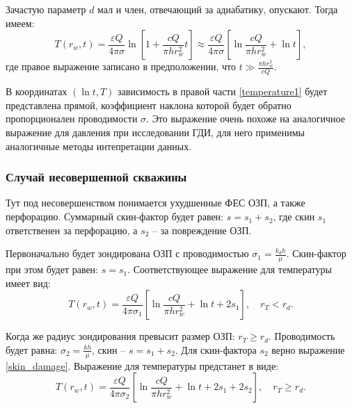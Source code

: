 	Зачастую параметр $d$ мал и член, отвечающий за адиабатику, опускают. Тогда имеем:
\begin{equation}
	\label{temperature1}
	T(r_w, t) = \frac{\varepsilon Q}{4 \pi \sigma}\ln\left[1+\frac{cQ}{\pi h r_w^2}t\right]	\approx
	\frac{\varepsilon Q}{4 \pi \sigma}\left[\ln\frac{cQ}{\pi h r_w^2}+\ln t\right],
\end{equation}
	где правое выражение записано в предположении, что $t \gg \displaystyle\frac{\pi h r_w^2}{cQ}$.
	
	В координатах $(\ln{t}, T)$ зависимость в правой части \eqref{temperature1} будет представлена прямой, коэффициент наклона которой будет обратно пропорционален проводимости $\sigma$.
	Это выражение очень похоже на аналогичное выражение для давления при исследовании ГДИ, для него применимы аналогичные методы интепретации данных.

\subsubsection{Случай несовершенной скважины}
	Тут под несовершенством понимается ухудшенные ФЕС ОЗП, а также перфорацию.
	Суммарный скин-фактор будет равен: $s = s_1 + s_2$, где скин $s_1$ ответственен за перфорацию, а $s_2$ -- за повреждение ОЗП.
	
	Первоначально будет зондирована ОЗП с проводимостью $\sigma_1 = \frac{k_dh}{\mu}$. Скин-фактор при этом будет равен:
	$s = s_1$.
	Соответствующее выражение для температуры имеет вид:
\begin{equation}
	\label{temperature2}
	T(r_w, t) = \frac{\varepsilon Q}{4 \pi \sigma_1}\left[\ln\frac{cQ}{\pi h r_w^2}+\ln t + 2s_1\right],
	\quad r_T < r_d.
\end{equation}
	
	Когда же радиус зондирования превысит размер ОЗП: $r_T \geq r_d$.
	Проводимость будет равна: $\sigma_2 = \frac{kh}{\mu}$, скин -- $s = s_1 + s_2$.
	Для скин-фактора $s_2$ верно выражение \eqref{skin_damage}.
	Выражение для температуры предстанет в виде:
\begin{equation}
	\label{temperature3}
	T(r_w, t) = \frac{\varepsilon Q}{4 \pi \sigma_2}\left[\ln\frac{cQ}{\pi h r_w^2}+\ln t + 2s_1 + 2s_2\right],
	\quad r_T \geq r_d.
\end{equation}

